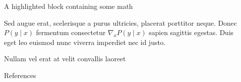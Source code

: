 \documentclass[final]{beamer}
\newlength{\sepwidth}
\newlength{\colwidth}
\newcommand{\separatorcolumn}{\begin{column}{\sepwidth}\end{column}}
\begin{document}
\begin{frame}[t]
\begin{columns}[t]
\begin{column}{\colwidth}
\begin{exampleblock}{A highlighted block containing some math}

    Sed augue erat, scelerisque a purus ultricies, placerat porttitor neque.
    Donec $P(y \mid x)$ fermentum consectetur $\nabla_x P(y \mid x)$ sapien
    sagittis egestas. Duis eget leo euismod nunc viverra imperdiet nec id
    justo.

  \end{exampleblock}

  \begin{block}{Nullam vel erat at velit convallis laoreet}

  \end{block}

  \begin{block}{References}

    \nocite{*}
    \footnotesize{}

  \end{block}

\end{column}

\separatorcolumn
\end{columns}
\end{frame}
\end{document}
